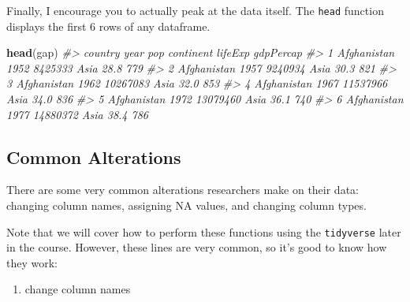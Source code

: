 \documentclass[]{book}
\newenvironment{Shaded}{\begin{snugshade}}{\end{snugshade}}
\newcommand{\KeywordTok}[1]{\textcolor[rgb]{0.13,0.29,0.53}{\textbf{#1}}}
\newcommand{\CommentTok}[1]{\textcolor[rgb]{0.56,0.35,0.01}{\textit{#1}}}
\newcommand{\NormalTok}[1]{#1}
\providecommand{\tightlist}{%
  \setlength{\itemsep}{0pt}\setlength{\parskip}{0pt}}
\begin{document}
\begin{Shaded}
\end{Shaded}

Finally, I encourage you to actually peak at the data itself. The
\texttt{head} function displays the first 6 rows of any dataframe.

\begin{Shaded}
\begin{Highlighting}[]
\KeywordTok{head}\NormalTok{(gap)}
\CommentTok{#>       country year      pop continent lifeExp gdpPercap}
\CommentTok{#> 1 Afghanistan 1952  8425333      Asia    28.8       779}
\CommentTok{#> 2 Afghanistan 1957  9240934      Asia    30.3       821}
\CommentTok{#> 3 Afghanistan 1962 10267083      Asia    32.0       853}
\CommentTok{#> 4 Afghanistan 1967 11537966      Asia    34.0       836}
\CommentTok{#> 5 Afghanistan 1972 13079460      Asia    36.1       740}
\CommentTok{#> 6 Afghanistan 1977 14880372      Asia    38.4       786}
\end{Highlighting}
\end{Shaded}

\subsection{Common Alterations}\label{common-alterations}

There are some very common alterations researchers make on their data:
changing column names, assigning NA values, and changing column types.

Note that we will cover how to perform these functions using the
\texttt{tidyverse} later in the course. However, these lines are very
common, so it's good to know how they work:

\begin{enumerate}
\def\labelenumi{\arabic{enumi}.}
\tightlist
\item
  change column names
\end{enumerate}
\end{document}
